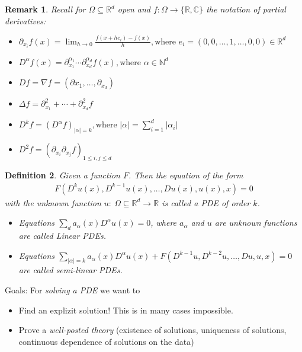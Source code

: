 \documentclass{report}
\theoremstyle{tommy}
\newtheorem{defn}{Definition}
\newtheorem{rem}[defn]{Remark}
\begin{document}
\begin{rem}
  Recall for \( \Omega \subseteq \mathbb{R}^d\) open and \(f: \Omega \to \{\mathbb{R}, \mathbb{C}\}\) the notation of partial derivatives:
  \begin{itemize}
    \item \(\partial_{x_i} f(x) = \lim_{h \to 0} \frac{f(x + he_i) - f(x)}{h}, \text{where } e_i = (0, 0, \dots, 1, \dots, 0, 0) \in \mathbb{R}^d\)
    \item \(D^\alpha f(x) = \partial_{x_1}^{\alpha_1} \cdots \partial_{x_d}^{\alpha_d} f(x), \text{where } \alpha \in \mathbb{N}^d\)
    \item \(Df = \nabla f = (\partial{x_1}, \ldots, \partial_{x_d})\)
    \item \(\Delta f = \partial_{x_1}^2 + \cdots + \partial^2_{x_d} f\)
    \item \(D^k f = (D^\alpha f)_{|\alpha| = k},  \text{where } |\alpha| = \sum_{i=1}^d |\alpha_i|\)
    \item \(D^2 f = (\partial_{x_i} \partial_{x_j} f)_{1 \le i, j \le d}\)
  \end{itemize}
\end{rem}

\begin{defn}
  Given a function \( F \). Then the equation of the form 
  \begin{align*}
    F(D^k u(x), D^{k-1} u(x), \dots, Du(x), u(x), x) = 0 
  \end{align*}
  with the unknown function \(u:\ \Omega \subseteq \mathbb{R}^d \longrightarrow \mathbb{R}\) is called a \emph{PDE of order \(k\)}.
  \begin{itemize}
    \item Equations \(\sum_d a_\alpha(x) D^\alpha u(x) = 0\), where \(a_\alpha\) and \(u\) are unknown functions are called \emph{Linear PDEs}. 
    \item Equations \(\sum_{|\alpha| = k} a_\alpha(x) D^\alpha u(x) + F(D^{k-1}u, D^{k-2}u, \dots, Du, u, x) = 0\) are called \emph{semi-linear PDEs}.
  \end{itemize}
\end{defn}

Goals: For \emph{solving a PDE} we want to
\begin{itemize}
  \item Find an explizit solution! This is in many cases impossible.
  \item Prove a \emph{well-posted theory} (existence of solutions, uniqueness of solutions, continuous dependence of solutions on the data)
\end{itemize}
\end{document}
